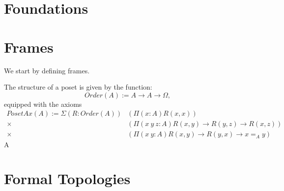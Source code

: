 \chapter{Foundations}

\chapter{Frames}

We start by defining frames.


\begin{defn}[Poset]
  The structure of a poset is given by the function:
  \begin{equation*}
    Order(A) := A \rightarrow A \rightarrow \Omega,
  \end{equation*}
  equipped with the axioms
  \begin{align*}
    PosetAx(A) := \Sigma \left(R : Order(A)\right)
                  &(\Pi(x : A) R(x, x))\\
                \times &(\Pi(x~y~z : A) R(x, y) \rightarrow R(y, z) \rightarrow R(x, z))\\
                \times &(\Pi(x~y : A) R(x, y) \rightarrow R(y, x) \rightarrow x =_A y)
  \end{align*}
  A
\end{defn}

\begin{defn}[Frame]
\end{defn}

\chapter{Formal Topologies}



